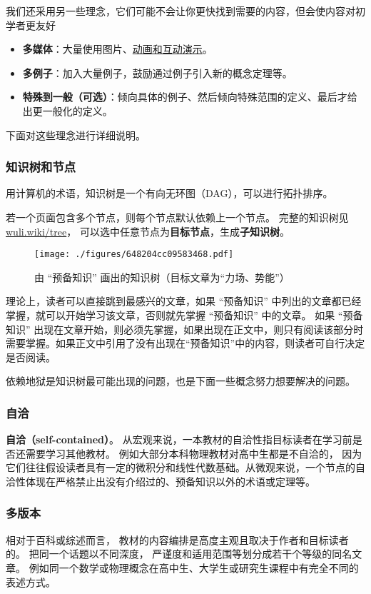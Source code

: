 我们还采用另一些理念，它们可能不会让你更快找到需要的内容，但会使内容对初学者更友好
\begin{itemize}
\item \textbf{多媒体}：大量使用图片、\href{https://wuli.wiki/apps/}{动画和互动演示}。
\item \textbf{多例子}：加入大量例子，鼓励通过例子引入新的概念定理等。
\item \textbf{特殊到一般（可选）}：倾向具体的例子、然后倾向特殊范围的定义、最后才给出更一般化的定义。
\end{itemize}
下面对这些理念进行详细说明。


\subsubsection{知识树和节点}
用计算机的术语，知识树是一个有向无环图（DAG），可以进行拓扑排序。 %

若一个页面包含多个节点，则每个节点默认依赖上一个节点。 完整的知识树见 \href{https://wuli.wiki/tree}{wuli.wiki/tree}， 可以选中任意节点为\textbf{目标节点}，生成\textbf{子知识树}。

\begin{figure}[ht]
\centering
\texttt{[image: ./figures/648204cc09583468.pdf]}
\caption{由 “预备知识” 画出的知识树（目标文章为“力场、势能”）}\label{fig_about_1}
\end{figure}

理论上，读者可以直接跳到最感兴的文章，如果 “预备知识” 中列出的文章都已经掌握，就可以开始学习该文章，否则就先掌握 “预备知识” 中的文章。 如果 “预备知识” 出现在文章开始，则必须先掌握，如果出现在正文中，则只有阅读该部分时需要掌握。如果正文中引用了没有出现在“预备知识”中的内容，则读者可自行决定是否阅读。

依赖地狱是知识树最可能出现的问题，也是下面一些概念努力想要解决的问题。

\subsubsection{自洽}
\textbf{自洽（self-contained）}。 从宏观来说，一本教材的自洽性指目标读者在学习前是否还需要学习其他教材。 例如大部分本科物理教材对高中生都是不自洽的， 因为它们往往假设读者具有一定的微积分和线性代数基础。从微观来说，一个节点的自洽性体现在严格禁止出没有介绍过的、预备知识以外的术语或定理等。

\subsubsection{多版本}
相对于百科或综述而言， 教材的内容编排是高度主观且取决于作者和目标读者的。 把同一个话题以不同深度， 严谨度和适用范围等划分成若干个等级的同名文章。 例如同一个数学或物理概念在高中生、大学生或研究生课程中有完全不同的表述方式。

